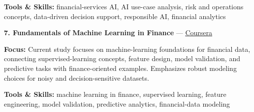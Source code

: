 \documentclass[9pt,letterpaper]{extarticle}
\begin{document}
{\small\textbf{Tools \& Skills:} financial-services AI, AI use-case analysis, risk and operations concepts, data-driven decision support, responsible AI, financial analytics\par}
\vspace{2pt}
\noindent\textbf{7. Fundamentals of Machine Learning in Finance} {\small --- \textcolor{blue}{\underline{\href{https://www.coursera.org/learn/fundamentals-machine-learning-in-finance}{Coursera}}}}\par
\textbf{Focus:} Current study focuses on machine-learning foundations for financial data, connecting supervised-learning concepts, feature design, model validation, and predictive tasks with finance-oriented examples. Emphasizes robust modeling choices for noisy and decision-sensitive datasets.\par
{\small\textbf{Tools \& Skills:} machine learning in finance, supervised learning, feature engineering, model validation, predictive analytics, financial-data modeling\par}
\vspace{2pt}
\end{document}
